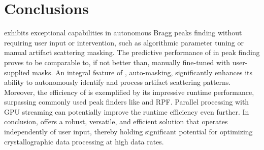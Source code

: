\documentclass[a4paper]{article}
\begin{document}
\begin{table}[t]
\caption{
    The runtime performance of diffraction image analysis algorithms measured on
    Rayonix images containing 3.7 megapixels.  We measured runtime performance
    of \psocake{} and \peaknet{} directly using Rayonix images.  For reference
    purposes, we also included another peak finding method RPF
    \citep{hadian-jaziPeakfindingAlgorithmBased2017,
    hadian-jaziDataReductionSerial2021} and two classification methods for X-ray
    diffraction data reduction. RPF runtime performance was originally measured
    on AGIPD 1M \citep{allahgholiAdaptiveGainIntegrating2019}.  
}
\label{tb : runtime}
\centering
{}
\end{table}


\section{Conclusions}

\peaknet{} exhibits exceptional capabilities in autonomous Bragg peaks finding without requiring user input or intervention, such as algorithmic parameter tuning or manual artifact scattering masking.  The predictive performance of \peaknet{} in peak finding proves to be comparable to, if not better than, manually fine-tuned \psocake{} with user-supplied masks.  An integral feature of \peaknet{}, auto-masking, significantly enhances its ability to autonomously identify and process artifact scattering patterns.  Moreover, the efficiency of \peaknet{} is exemplified by its impressive runtime performance, surpassing commonly used peak finders like \psocake{} and RPF.  Parallel processing with GPU streaming can potentially improve the runtime efficiency even further.  In conclusion, \peaknet{}  offers a robust, versatile, and efficient solution that operates independently of user input, thereby holding significant potential for optimizing crystallographic data processing at high data rates.



\end{document}
